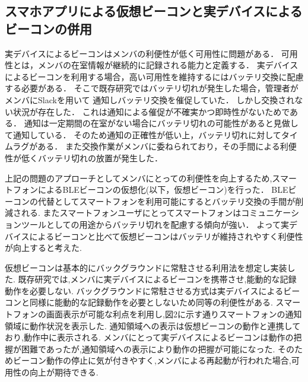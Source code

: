 
\subsection{スマホアプリによる仮想ビーコンと実デバイスによるビーコンの併用}



実デバイスによるビーコンはメンバの利便性が低く可用性に問題がある．
可用性とは，メンバの在室情報が継続的に記録される能力と定義する．
実デバイスによるビーコンを利用する場合，高い可用性を維持するにはバッテリ交換に配慮する必要がある．
そこで既存研究ではバッテリ切れが発生した場合，管理者がメンバにSlackを用いて
通知しバッテリ交換を催促していた．
しかし交換されない状況が存在した．
これは通知による催促が不確実かつ即時性がないためである．
通知は一定期間の在室がない場合にバッテリ切れの可能性があると見做して通知している．
そのため通知の正確性が低い上，バッテリ切れに対してタイムラグがある．
また交換作業がメンバに委ねられており，その手間による利便性が低くバッテリ切れの放置が発生した．


上記の問題のアプローチとしてメンバにとっての利便性を向上するため,スマートフォンによるBLEビーコンの仮想化(以下，仮想ビーコン)を行った．
BLEビーコンの代替としてスマートフォンを利用可能にするとバッテリ交換の手間が削減される.
またスマートフォンユーザにとってスマートフォンはコミュニケーションツールとしての用途からバッテリ切れを配慮する傾向が強い．
よって実デバイスによるビーコンと比べて仮想ビーコンはバッテリが維持されやすく利便性が向上すると考えた.

仮想ビーコンは基本的にバックグラウンドに常駐させる利用法を想定し実装した.
既存研究では,メンバに実デバイスによるビーコンを携帯させ,能動的な記録動作を必要しない.
バックグラウンドに常駐させる方式は実デバイスによるビーコンと同様に能動的な記録動作を必要としないため同等の利便性がある.
スマートフォンの画面表示が可能な利点を利用し,図2に示す通りスマートフォンの通知領域に動作状況を表示した.
通知領域への表示は仮想ビーコンの動作と連携しており,動作中に表示される.
メンバにとって実デバイスによるビーコンは動作の把握が困難であったが,通知領域への表示により動作の把握が可能になった.
そのためビーコン動作の停止に気が付きやすく,メンバによる再起動が行われた場合,可用性の向上が期待できる.

